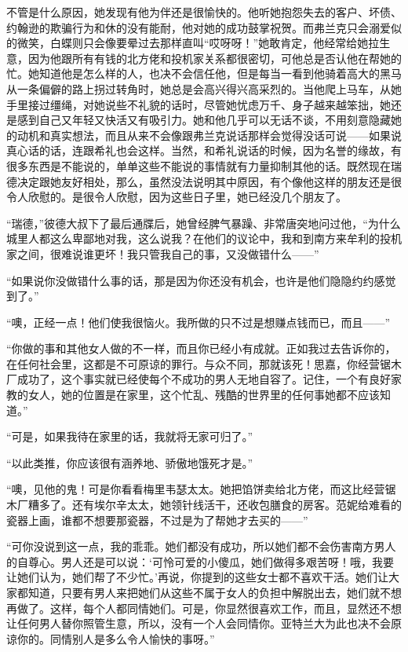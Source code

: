 \par 不管是什么原因，她发现有他为伴还是很愉快的。他听她抱怨失去的客户、坏债、约翰逊的欺骗行为和休的没有能耐，他对她的成功鼓掌祝贺。而弗兰克只会溺爱似的微笑，白蝶则只会像要晕过去那样直叫“哎呀呀！”她敢肯定，他经常给她拉生意，因为他跟所有有钱的北方佬和投机家关系都很密切，可他总是否认他在帮她的忙。她知道他是怎么样的人，也决不会信任他，但是每当一看到他骑着高大的黑马从一条偏僻的路上拐过转角时，她总是会高兴得兴高采烈的。当他爬上马车，从她手里接过缰绳，对她说些不礼貌的话时，尽管她忧虑万千、身子越来越笨拙，她还是感到自己又年轻又快活又有吸引力。她和他几乎可以无话不谈，不用刻意隐藏她的动机和真实想法，而且从来不会像跟弗兰克说话那样会觉得没话可说——如果说真心话的话，连跟希礼也会这样。当然，和希礼说话的时候，因为名誉的缘故，有很多东西是不能说的，单单这些不能说的事情就有力量抑制其他的话。既然现在瑞德决定跟她友好相处，那么，虽然没法说明其中原因，有个像他这样的朋友还是很令人欣慰的。是很令人欣慰，因为这些日子里，她已经没几个朋友了。
\par “瑞德，”彼德大叔下了最后通牒后，她曾经脾气暴躁、非常唐突地问过他，“为什么城里人都这么卑鄙地对我，这么说我？在他们的议论中，我和到南方来牟利的投机家之间，很难说谁更坏！我只管我自己的事，又没做错什么——”
\par “如果说你没做错什么事的话，那是因为你还没有机会，也许是他们隐隐约约感觉到了。”
\par “噢，正经一点！他们使我很恼火。我所做的只不过是想赚点钱而已，而且——”
\par “你做的事和其他女人做的不一样，而且你已经小有成就。正如我过去告诉你的，在任何社会里，这都是不可原谅的罪行。与众不同，那就该死！思嘉，你经营锯木厂成功了，这个事实就已经使每个不成功的男人无地自容了。记住，一个有良好家教的女人，她的位置是在家里，这个忙乱、残酷的世界里的任何事她都不应该知道。”
\par “可是，如果我待在家里的话，我就将无家可归了。”
\par “以此类推，你应该很有涵养地、骄傲地饿死才是。”
\par “噢，见他的鬼！可是你看看梅里韦瑟太太。她把馅饼卖给北方佬，而这比经营锯木厂糟多了。还有埃尔辛太太，她领针线活干，还收包膳食的房客。范妮给难看的瓷器上画，谁都不想要那瓷器，不过是为了帮她才去买的——”
\par “可你没说到这一点，我的乖乖。她们都没有成功，所以她们都不会伤害南方男人的自尊心。男人还是可以说：‘可怜可爱的小傻瓜，她们做得多艰苦呀！哦，我要让她们认为，她们帮了不少忙。’再说，你提到的这些女士都不喜欢干活。她们让大家都知道，只要有男人来把她们从这些不属于女人的负担中解脱出去，她们就不想再做了。这样，每个人都同情她们。可是，你显然很喜欢工作，而且，显然还不想让任何男人替你照管生意，所以，没有一个人会同情你。亚特兰大为此也决不会原谅你的。同情别人是多么令人愉快的事呀。”
